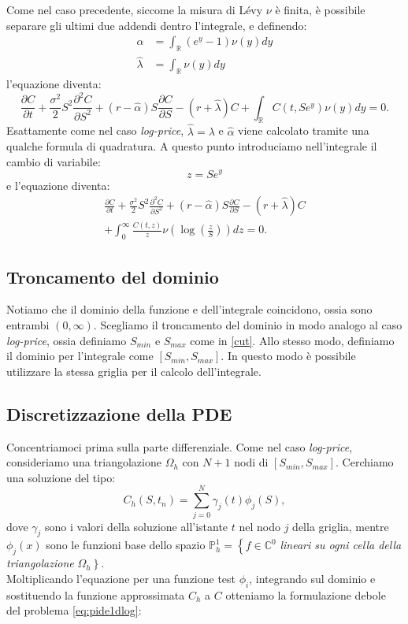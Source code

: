 \documentclass[a4paper,10pt]{report}
\newcommand{\der}[2]{\frac{\partial #1}{\partial #2}}
\newcommand{\dder}[2]{\frac{\partial^2 #1}{\partial #2^2}}
\theoremstyle{plain}
\theoremstyle{definition}
\theoremstyle{remark}
\begin{document}
Come nel caso precedente, siccome la misura di Lévy $\nu$ è finita, è possibile separare gli ultimi due addendi dentro l'integrale, e definendo:
\begin{align*}
 \hat{\alpha}&=\int_\mathbb{R}(e^y-1)\nu(y)dy \\
 \hat{\lambda}&=\int_\mathbb{R}\nu(y)dy
\end{align*}
l'equazione diventa:
\begin{equation*}
\der{C}{t}+\frac{\sigma^2}{2}S^2\dder{C}{S}+(r-\hat{\alpha})S\der{C}{S}-(r+\hat{\lambda})C+ \int_\mathbb{R}C(t,Se^y)\nu(y)dy=0.
\end{equation*}
Esattamente come nel caso \emph{log-price}, $\hat{\lambda}=\lambda$ e $\hat{\alpha}$ viene calcolato tramite una qualche formula di quadratura. A questo punto introduciamo nell'integrale il cambio di variabile:
\begin{equation*}
 z=Se^y
\end{equation*}
e l'equazione diventa:
\begin{multline}
\label{eq:PIDEinPrice}
\der{C}{t}+\frac{\sigma^2}{2}S^2\dder{C}{S}+(r-\hat{\alpha})S\der{C}{S}-(r+\hat{\lambda})C\\+\int_0^\infty \frac{C(t,z)}{z}\nu\left(\log\left(\frac{z}{S}\right) \right)dz=0.
\end{multline}

\subsection{Troncamento del dominio}

Notiamo che il dominio della funzione e dell'integrale coincidono, ossia sono entrambi $(0,\infty)$.
Scegliamo il troncamento del dominio in modo analogo al caso \emph{log-price}, ossia definiamo $S_{min}$ e $S_{max}$ come in \eqref{cut}. Allo stesso modo, definiamo il dominio per l'integrale come $[S_{min},S_{max}]$. In questo modo è possibile utilizzare la stessa griglia per il calcolo dell'integrale.

\subsection{Discretizzazione della PDE}
Concentriamoci prima sulla parte differenziale. Come nel caso \emph{log-price}, consideriamo una triangolazione $\Omega_h$ con $N+1$ nodi di $[S_{min},S_{max}]$. Cerchiamo una soluzione del tipo: $$C_h(S,t_n)=\sum_{j=0}^{N}\gamma_j(t)\phi_j(S),$$ dove $\gamma_j$ sono i valori della soluzione all'istante $t$ nel nodo $j$ della griglia, mentre $\phi_j(x)$ sono le funzioni base dello spazio $\mathbb{P}_h^1=\left\{f\in\mathbb{C}^0\right.$ \emph{lineari su ogni cella della triangolazione} $\Omega_h\left.\right\}$.\\
Moltiplicando l'equazione per una funzione test $\phi_i$, integrando sul dominio e sostituendo la funzione approssimata $C_h$ a $C$ otteniamo la formulazione debole del problema \eqref{eq:pide1dlog}:
\end{document}
